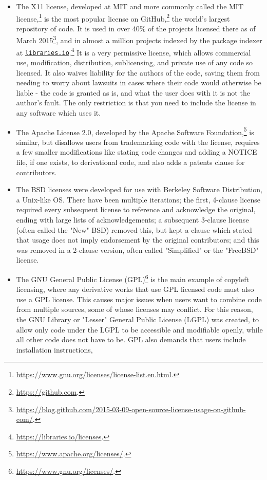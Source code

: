\begin{itemize}
\item The X11 license, developed at MIT and more commonly called the MIT license,\footnote{\href{https://www.gnu.org/licenses/license-list.en.html}{https://www.gnu.org/licenses/license-list.en.html}. } is the most popular license on Git\-Hub,\footnote{\href{https://github.com}{https://github.com}. } the world's largest repository of code. It is used in over 40\% of the projects licensed there as of March 2015\footnote{\href{https://blog.github.com/2015-03-09-open-source-license-usage-on-github-com/}{https://blog.github.com/2015-03-09-open-source-license-usage-on-github-com/}. }, and in almost a million projects indexed by the package indexer at \href{https://libraries.io}{\nolinkurl{libraries.io}}.\footnote{\href{https://libraries.io/licenses}{https://libraries.io/licenses}. } It is a very permissive license, which allows commercial use, modification, distribution, sublicensing, and private use of any code so licensed. It also waives liability for the authors of the code, saving them from needing to worry about lawsuits in cases where their code would otherwise be liable - the code is granted as is, and what the user does with it is not the author's fault. The only restriction is that you need to include the license in any software which uses it.
\item The Apache License 2.0, developed by the Apache Software Foundation,\footnote{\href{https://www.apache.org/licenses/}{https://www.apache.org/licenses/}. } is similar, but disallows users from trademarking code with the license, requires a few smaller modifications like stating code changes and adding a NOTICE file, if one exists, to derivational code, and also adds a patents clause for contributors.
\item The BSD licenses were developed for use with Berkeley Software Distribution, a Unix-like OS. There have been multiple iterations; the first, 4-clause license required every subsequent license to reference and acknowledge the original, ending with large lists of acknowledgements; a subsequent 3-clause license (often called the "New" BSD) removed this, but kept a clause which stated that usage does not imply endorsement by the original contributors; and this was removed in a 2-clause version, often called "Simplified" or the "FreeBSD" license.
\item The GNU General Public License (GPL)\footnote{\href{https://www.gnu.org/licenses/}{https://www.gnu.org/licenses/}. } is the main example of copyleft licensing, where any derivative works that use GPL licensed code must also use a GPL license. This causes major issues when users want to combine code from multiple sources, some of whose licenses may conflict. For this reason, the GNU Library or "Lesser" General Public License (LGPL) was created, to allow only code under the LGPL to be accessible and modifiable openly, while all other code does not have to be. GPL also demands that users include installation instructions,

\end{itemize}
